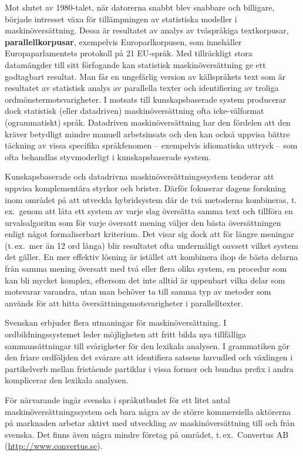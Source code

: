 \begin{multicols}{2}
Mot slutet av 1980-talet, när datorerna snabbt blev snabbare och
billigare, började intresset växa för tillämpningen av statistiska
modeller i maskin\-över\-sätt\-ning. Dessa är resultatet av analys av
tvåspråkiga textkorpusar, \textbf{parallellkorpusar}, exempelvis
Europarlkorpusen, som innehåller Europaparlamentets protokoll på 21
EU-språk. Med tillräckligt stora data\-mängd\-er till sitt förfogande
kan statistisk maskin\-över\-sätt\-ning ge ett godtagbart resultat. Man får
en unge\-fär\-lig version av källspråkets text som är resultatet av
statistisk analys av parallella texter och identifiering av troliga
ord\-mönster\-mot\-svarig\-het\-er. I motsats till kunskapsbaserade
system producerar dock statistisk (eller datadriven)
maskin\-över\-sätt\-ning ofta icke-välformat (ogrammatiskt)
språk. Datadriven maskin\-över\-sätt\-ning har den fördelen att den kräver
betydligt mindre manuell arbetsinsats och den kan också uppvisa bättre
täckning av vissa specifika språkfenomen -- exempelvis idiomatiska
uttryck -- som ofta behandlas styvmoderligt i kunskapsbaserade system.

Kunskapsbaserade och datadrivna maskin\-över\-sätt\-ningssystem tenderar att
uppvisa komplementära styrkor och brister. Därför fokuserar dagens
forskning inom området på att utveckla hybridsystem där de två
metoderna kombineras, t.\,ex.~genom att låta ett system av varje slag
översätta samma text och tillföra en ur\-vals\-algo\-ritm som för
varje översatt mening väljer den bästa översättningen enligt något
formaliserbart kriterium. Det visar sig dock att för längre meningar
(t.\,ex.~mer än 12 ord långa) blir resultatet ofta undermåligt oavsett
vilket system det gäller. En mer effektiv lösning är istället att
kombinera ihop de bästa delarna från samma mening översatt med två
eller flera olika system, en procedur som kan bli mycket komplex,
eftersom det inte alltid är uppenbart vilka delar som motsvarar
varandra, utan man behöver ta till samma typ av metoder som används
för att hitta översättningsmotsvarigheter i parallelltexter.

Svenskan erbjuder flera utmaningar för maskin\-över\-sätt\-ning. I
ordbildningssystemet leder möjligheten att fritt bilda nya tillfälliga
sammansättningar till svårigheter för den lexikala analysen. I
grammatiken gör den friare ordföljden det svårare att identifiera
satsens huvudled och växlingen i partikelverb mellan fristående
partiklar i vissa former och bundna prefix i andra komplicerar den
lexikala analysen.

För närvarande ingår svenska i språkutbudet för ett litet antal
maskin\-över\-sätt\-ningssystem och bara några av de större kommersiella
aktörerna på marknaden arbetar aktivt med utveckling av
maskin\-över\-sätt\-ning till och från svenska. Det finns även några mindre
företag på området, t.\,ex.~Convertus AB (\url{http://www.convertus.se}).


\end{multicols}
